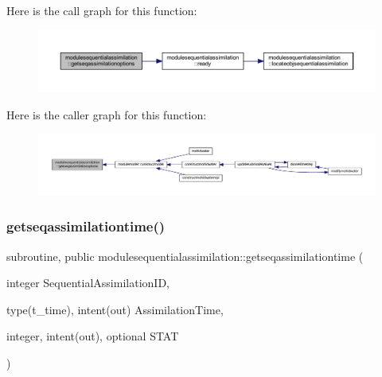 Here is the call graph for this function\+:\nopagebreak
\begin{figure}[H]
\begin{center}
\leavevmode
\includegraphics[width=350pt]{namespacemodulesequentialassimilation_a1df3565c62b239e627e2abf8edf5339e_cgraph}
\end{center}
\end{figure}
Here is the caller graph for this function\+:\nopagebreak
\begin{figure}[H]
\begin{center}
\leavevmode
\includegraphics[width=350pt]{namespacemodulesequentialassimilation_a1df3565c62b239e627e2abf8edf5339e_icgraph}
\end{center}
\end{figure}
\mbox{\label{namespacemodulesequentialassimilation_a79adcfc8fb983a24237bd6bba818eca8}} 
\subsubsection{\texorpdfstring{getseqassimilationtime()}{getseqassimilationtime()}}
{\footnotesize\ttfamily subroutine, public modulesequentialassimilation\+::getseqassimilationtime (\begin{DoxyParamCaption}\item[{integer}]{Sequential\+Assimilation\+ID,  }\item[{type(t\+\_\+time), intent(out)}]{Assimilation\+Time,  }\item[{integer, intent(out), optional}]{S\+T\+AT }\end{DoxyParamCaption})}

